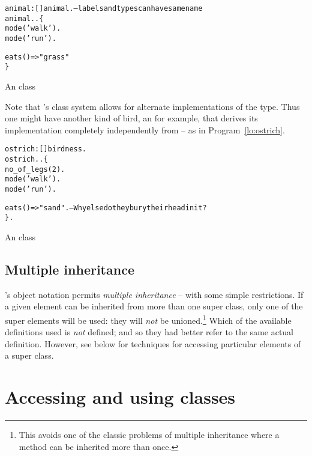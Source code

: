 \begin{program}
\begin{boxed}
\begin{alltt}
animal:[]\conarrow{}animal.      -- {\rm labels and types can have same name}
animal..\{
  mode('walk').
  mode('run').
  
  eats()=>"grass"
\}
\end{alltt}
\end{boxed}
\caption{\label{lo:animal}An  class}
\end{program}
Note that \go's class system allows for alternate implementations of the type. Thus one might have another kind of bird, an  for example, that derives its implementation completely independently from  -- as in Program~\vref{lo:ostrich}.
\begin{program}
\begin{boxed}
\begin{alltt}
ostrich:[]\conarrow{}birdness.
ostrich..\{
  no\_of\_legs(2).
  mode('walk').
  mode('run').
  
  eats()=>"sand".       -- {\rm Why else do they bury their head in it?}
\}.
\end{alltt}
\end{boxed}
\caption{\label{lo:ostrich}An  class}
\end{program}

\subsection{Multiple inheritance}
\go's object notation permits \emph{multiple inheritance} -- with some simple restrictions. If a given element can be inherited from more than one super class, only one of the super elements will be used: they will \emph{not} be unioned.\footnote{This avoids one of the classic problems of multiple inheritance where a method can be inherited more than once.} Which of the available definitions used is \emph{not} defined; and so they had better refer to the same actual definition.  However, see below for techniques for accessing particular elements of a super class.

\section{Accessing and using classes}
\label{lo:access}


